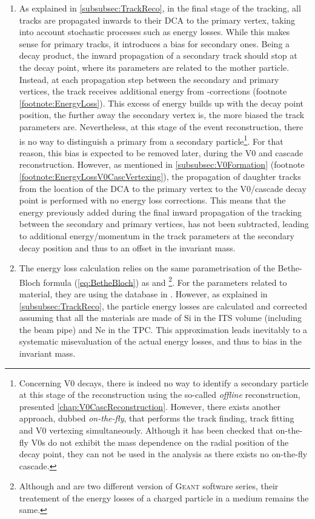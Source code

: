 \begin{enumerate}
\item As explained in \Sec\ref{subsubsec:TrackReco}, in the final stage of the tracking, all tracks are propagated inwards to their DCA to the primary vertex, taking into account stochastic processes such as energy losses. While this makes sense for primary tracks, it introduces a bias for secondary ones. Being a decay product, the inward propagation of a secondary track should stop at the decay point, where its parameters are related to the mother particle. Instead, at each propagation step between the secondary and primary vertices, the track receives additional energy from \dEdx-corrections (footnote \ref{footnote:EnergyLoss}). This excess of energy builds up with the decay point position, the further away the secondary vertex is, the more biased the track parameters are. Nevertheless, at this stage of the event reconstruction, there is no way to distinguish a primary from a secondary particle\footnote{Concerning V0 decays, there is indeed no way to identify a secondary particle at this stage of the reconstruction using the so-called \textit{offline} reconstruction, presented \chap\ref{chap:V0CascReconstruction}. However, there exists another approach, dubbed \textit{on-the-fly}, that performs the track finding, track fitting and V0 vertexing simultaneously. Although it has been checked that on-the-fly V0s do not exhibit the mass dependence on the radial position of the decay point, they can not be used in the analysis as there exists no on-the-fly cascade.}. For that reason, this bias is expected to be removed later, during the V0 and cascade reconstruction. However, as mentioned in \Sec\ref{subsubsec:V0Formation} (footnote \ref{footnote:EnergyLossV0CascVertexing}), the propagation of daughter tracks from the location of the DCA to the primary vertex to the V0/cascade decay point is performed with no energy loss corrections. This means that the energy previously added during the final inward propagation of the tracking between the secondary and primary vertices, has not been subtracted, leading to additional energy/momentum in the track parameters at the
secondary decay position and thus to an offset in the invariant mass.

\item The energy loss calculation relies on the same parametrisation of the Bethe-Bloch formula (\eq\ref{eq:BetheBloch}) as \GeantThree and \GeantFour\footnote{Although \GeantThree and \GeantFour are two different version of \textsc{Geant} software series, their treatement of the energy losses of a charged particle in a medium remains the same.}. For the parameters related to material, they are using the database in \cite{geant4Geant4MaterialDatabase2022}. However, as explained in \Sec\ref{subsubsec:TrackReco}, the particle energy losses are calculated and corrected assuming that all the materials are made of Si in the ITS volume (including the beam pipe) and Ne in the TPC. This approximation leads inevitably to a systematic misevaluation of the actual energy losses, and thus to bias in the invariant mass.


\end{enumerate}

